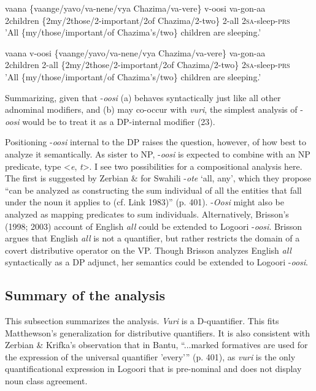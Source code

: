 \documentclass[output=paper]{langsci/langscibook}
\begin{document}
\ea 
\gll vaana  \textup{\{}vaange\textup{/}yavo\textup{/}va-nene/vya Chazima/va-vere\}  v-oosi  va-gon-aa\\
     2children  \{2my/2those/2-important/2of Chazima/2-two\}  2-all  2\textsc{sa}{}-sleep-\textsc{prs}\\
\glt 'All \{my/those/important/of Chazima's/two\} children are sleeping.'  
\z

\ea
\gll vaana  v-oosi\textup{   \{}vaange\textup{/}yavo\textup{/}va-nene/vya Chazima/va-vere\}  va-gon-aa\\
     2children  2-all   \{2my/2those/2-important/2of Chazima/2-two\}  2\textsc{sa}{}-sleep-\textsc{prs}\\
     'All \{my/those/important/of Chazima's/two\} children are sleeping.'  \\
\z

  Summarizing, given that -\textit{oosi} (a) behaves syntactically just like all other adnominal modifiers, and (b) may co-occur with \textit{vuri}, the simplest analysis of -\textit{oosi} would be to treat it as a DP-internal modifier (23).

  Positioning -\textit{oosi} internal to the DP raises the question, however, of how best to analyze it semantically. As sister to NP, -\textit{oosi} is expected to combine with an NP predicate, type <\textit{e},\textit{ t}>. I see two possibilities for a compositional analysis here. The first is suggested by Zerbian \& \citet{Krifka2008} for Swahili -\textit{ote} ‘all, any’, which they propose “can be analyzed as constructing the sum individual of all the entities that fall under the noun it applies to (cf. Link 1983)” (p. 401). -\textit{Oosi} might also be analyzed as mapping predicates to sum individuals. Alternatively, Brisson’s (1998; 2003) account of English \textit{all} could be extended to Logoori -\textit{oosi}. Brisson argues that English \textit{all} is not a quantifier, but rather restricts the domain of a covert distributive operator on the VP. Though Brisson analyzes English \textit{all} syntactically as a DP adjunct, her semantics could be extended to Logoori -\textit{oosi}. 

\subsection{Summary of the analysis}

  This subsection summarizes the analysis. \textit{Vuri} is a D-quantifier. This fits Matthewson's generalization for distributive quantifiers. It is also consistent with Zerbian \& Krifka's observation that in Bantu, “...marked formatives are used for the expression of the universal quantifier 'every'” (p. 401), as \textit{vuri} is the only quantificational expression in Logoori that is pre-nominal and does not display noun class agreement. 
\end{document}
